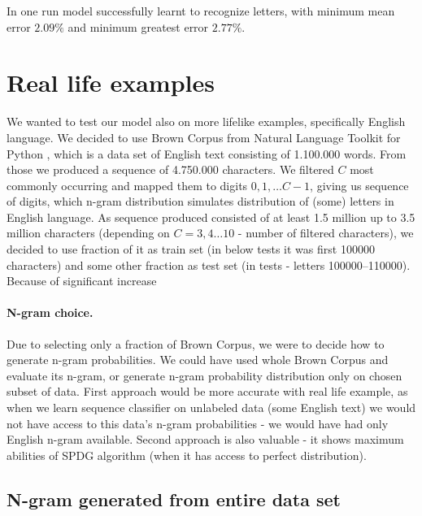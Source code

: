 \documentclass[shortabstract,lic,english]{iithesis}
\begin{document}
In one run model successfully learnt to recognize letters, with minimum mean error $2.09\%$ and minimum greatest error $2.77\%$.




\section{Real life examples}

We wanted to test our model also on more lifelike examples, specifically English language. We decided to use Brown Corpus \citep{francis1964brown} from Natural Language Toolkit for Python \citep{loper2002nltk}, which is a data set of English text consisting of 1.100.000 words. From those we produced a sequence of 4.750.000 characters. We filtered $C$ most commonly occurring and mapped them to digits $0, 1, \dots C-1$, giving us sequence of digits, which n-gram distribution simulates distribution of (some) letters in English language. As sequence produced consisted of at least 1.5 million up to 3.5 million characters (depending on $C=3,4\dots10$ - number of filtered characters), we decided to use fraction of it as train set (in below tests it was first 100000 characters) and some other fraction
as test set (in tests - letters 100000--110000). Because of significant increase 

\paragraph{N-gram choice.} Due to selecting only a fraction of Brown Corpus, we were to decide how to generate n-gram probabilities. We could have used whole Brown Corpus and evaluate its n-gram, or generate n-gram probability distribution only on chosen subset of data. First approach would be more accurate with real life example, as when we learn sequence classifier on unlabeled data (some English text) we would not have access to this data's n-gram probabilities - we would have had only English n-gram available. Second approach is also valuable - it shows maximum abilities of SPDG algorithm (when it has access to perfect distribution).

\subsection{N-gram generated from entire data set}
\end{document}
